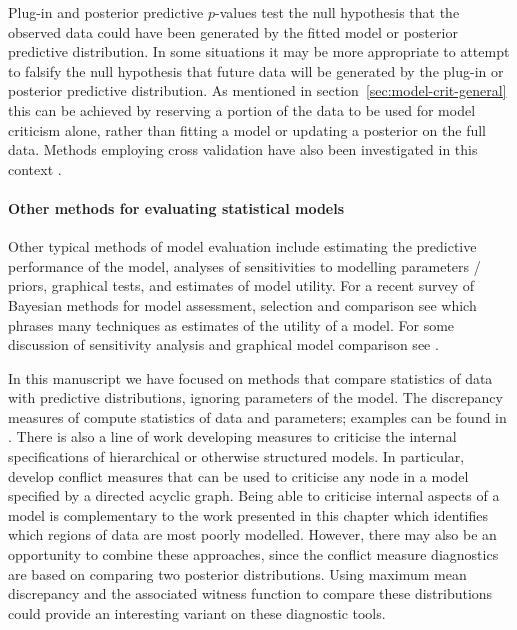 Plug-in and posterior predictive $p$-values test the null hypothesis that the observed data could have been generated by the fitted model or posterior predictive distribution.
In some situations it may be more appropriate to attempt to falsify the null hypothesis that future data will be generated by the plug-in or posterior predictive distribution.
As mentioned in section~\ref{sec:model-crit-general} this can be achieved by reserving a portion of the data to be used for model criticism alone, rather than fitting a model or updating a posterior on the full data.
Methods employing cross validation have also been investigated in this context \citep[e.g.][]{Gelfand1992-ow, Marshall2007-hd, Presanis2013-fg}.

\paragraph{Other methods for evaluating statistical models}

Other typical methods of model evaluation include estimating the predictive performance of the model, analyses of sensitivities to modelling parameters / priors, graphical tests, and estimates of model utility.
For a recent survey of Bayesian methods for model assessment, selection and comparison see \cite{Vehtari2012-oh} which phrases many techniques as estimates of the utility of a model.
For some discussion of sensitivity analysis and graphical model comparison see \eg \citet{Gelman2013-st}.

In this manuscript we have focused on methods that compare statistics of data with predictive distributions, ignoring parameters of the model.
The discrepancy measures of \cite{Gelman1996-ez} compute statistics of data and parameters; examples can be found in \cite{Gelman2013-st}.
There is also a line of work \citep{Marshall2007-hd, OHagan2003-bc, Bayarri2007-nk, Presanis2013-fg, Dahl2007-fi, Gasemyr2009-yh, Scheel2011-jz} developing measures to criticise the internal specifications of hierarchical or otherwise structured models.
In particular, \citet{Presanis2013-fg} develop conflict measures that can be used to criticise any node in a model specified by a directed acyclic graph.
Being able to criticise internal aspects of a model is complementary to the work presented in this chapter which identifies which regions of data are most poorly modelled.
However, there may also be an opportunity to combine these approaches, since the conflict measure diagnostics are based on comparing two posterior distributions.
Using maximum mean discrepancy and the associated witness function to compare these distributions could provide an interesting variant on these diagnostic tools.

